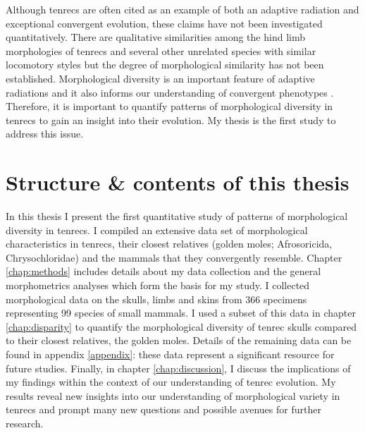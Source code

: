 	Although tenrecs are often cited as an example of both an adaptive radiation and exceptional convergent evolution, these claims have not been investigated quantitatively. There are qualitative similarities among the hind limb morphologies of tenrecs and several other unrelated species with similar locomotory styles \citep{Salton2009} but the degree of morphological similarity has not been established. Morphological diversity is an important feature of adaptive radiations \citep{Losos2010a} and it also informs our understanding of convergent phenotypes \citep{Muschick2012}. Therefore, it is important to quantify patterns of morphological diversity in tenrecs to gain an insight into their evolution. My thesis is the first study to address this issue. 

\section{Structure \& contents of this thesis}

	In this thesis I present the first quantitative study of patterns of morphological diversity in tenrecs. I compiled an extensive data set of morphological characteristics in tenrecs, their closest relatives (golden moles; Afrosoricida, Chrysochloridae) and the mammals that they convergently resemble. Chapter \ref{chap:methods} includes details about my data collection and the general morphometrics analyses which form the basis for my study. I collected morphological data on the skulls, limbs and skins from 366 specimens representing 99 species of small mammals. I used a subset of this data in chapter \ref{chap:disparity} to quantify the morphological diversity of tenrec skulls compared to their closest relatives, the golden moles. Details of the remaining data can be found in appendix \ref{appendix}: these data represent a significant resource for future studies. Finally, in chapter \ref{chap:discussion}, I discuss the implications of my findings within the context of our understanding of tenrec evolution. %
 	My results reveal new insights into our understanding of morphological variety in tenrecs and prompt many new questions and possible avenues for further research.


